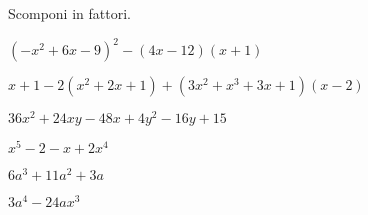 
\begin{esercizio}[*]
\label{ese:17.28}
Scomponi in fattori.
\begin{enumeratea}
\item \((-x^{2}+6x-9)^{2}-(4x-12)(x+1)\)
\item \(x+1-2(x^{2}+2x+1)+(3x^{2}+x^{3}+3x+1)(x-2)\)
\item \(36x^{2}+24xy-48x+4y^{2}-16y+15\)
\item \(x^{5}-2-x+2x^{4}\)
\item \(6a^{3}+11a^{2}+3a\)
\item \(3a^{4}-24ax^{3}\)
\end{enumeratea}
\end{esercizio}

